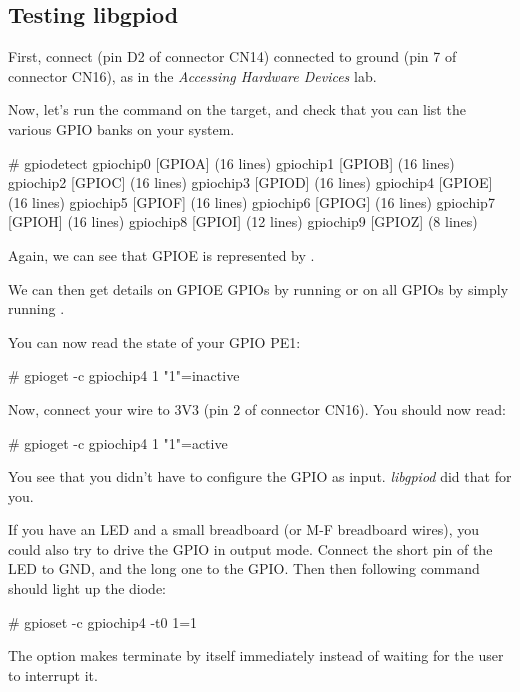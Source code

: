 \subsection{Testing libgpiod}

First, connect  (pin D2 of connector CN14) connected
to ground (pin 7 of connector CN16), as in the
{\em Accessing Hardware Devices} lab.

Now, let's run the  command on the target, and check that
you can list the various GPIO banks on your system.

\begin{bashinput}
# gpiodetect
gpiochip0 [GPIOA] (16 lines)
gpiochip1 [GPIOB] (16 lines)
gpiochip2 [GPIOC] (16 lines)
gpiochip3 [GPIOD] (16 lines)
gpiochip4 [GPIOE] (16 lines)
gpiochip5 [GPIOF] (16 lines)
gpiochip6 [GPIOG] (16 lines)
gpiochip7 [GPIOH] (16 lines)
gpiochip8 [GPIOI] (12 lines)
gpiochip9 [GPIOZ] (8 lines)
\end{bashinput}

Again, we can see that GPIOE is represented by .

We can then get details on GPIOE GPIOs by running
 or on all GPIOs by simply running
.

You can now read the state of your GPIO PE1:

\begin{bashinput}
# gpioget -c gpiochip4 1
"1"=inactive
\end{bashinput}

Now, connect your wire to 3V3 (pin 2 of connector CN16). You should now
read:

\begin{bashinput}
# gpioget -c gpiochip4 1
"1"=active
\end{bashinput}

You see that you didn't have to configure the GPIO as input. {\em
libgpiod} did that for you.

If you have an LED and a small breadboard (or M-F breadboard wires),
you could also try to drive the GPIO in output mode. Connect the short
pin of the LED to GND, and the long one to the GPIO. Then then following
command should light up the diode:

\begin{bashinput}
# gpioset -c gpiochip4 -t0 1=1
\end{bashinput}

The  option makes  terminate by itself
immediately instead of waiting for the user to interrupt it.

